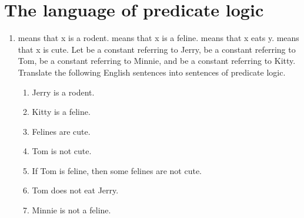 \section*{The language of predicate logic}


\newcommand{\ansk}[1]{\opts{
  
  \vskip 0.5em
  \dotline

 }
 {#1}
}

\newcommand{\ansF}{\dotfill True/\anscircled{False}}
\newcommand{\ansT}{\dotfill \anscircled{True}/False}

\renewcommand{\lbh}[1]{}

\begin{enumerate}

 \item {} means that x is a rodent.  means that x is a feline.  
  means that x eats y.  means that x is cute. Let  be a constant 
  referring to Jerry,  be a constant referring to Tom,  be a constant 
  referring to Minnie, and  be a constant referring to Kitty.  Translate 
  the following English sentences into sentences of predicate logic.


  \begin{enumerate}
   \setlength{\itemsep}{1em}
   \item Jerry is a rodent.

	\ansk{}

   \item Kitty is a feline.

	\ansk{}

   \item Felines are cute.

	\ansk{}

   \item Tom is not cute.

	\ansk{}

	\item If Tom is feline, then some felines are not cute.

	 \ansk{}

	\item Tom does not eat Jerry.

	 \ansk{}

	\item Minnie is not a feline.


\end{enumerate}
\end{enumerate}
